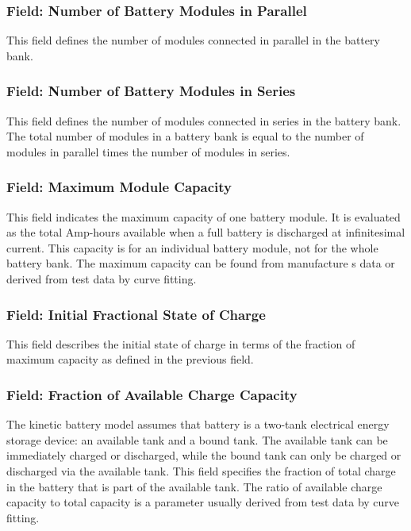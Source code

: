 \subsubsection{Field: Number of Battery Modules in Parallel}\label{field-number-of-battery-modules-in-parallel}

This field defines the number of modules connected in parallel in the battery bank.

\subsubsection{Field: Number of Battery Modules in Series}\label{field-number-of-battery-modules-in-series}

This field defines the number of modules connected in series in the battery bank. The total number of modules in a battery bank is equal to the number of modules in parallel times the number of modules in series.

\subsubsection{Field: Maximum Module Capacity}\label{field-maximum-module-capacity}

This field indicates the maximum capacity of one battery module. It is evaluated as the total Amp-hours available when a full battery is discharged at infinitesimal current. This capacity is for an individual battery module, not for the whole battery bank. The maximum capacity can be found from manufacture s data or derived from test data by curve fitting.

\subsubsection{Field: Initial Fractional State of Charge}\label{field-initial-fractional-state-of-charge}

This field describes the initial state of charge in terms of the fraction of maximum capacity as defined in the previous field.

\subsubsection{Field: Fraction of Available Charge Capacity}\label{field-fraction-of-available-charge-capacity}

The kinetic battery model assumes that battery is a two-tank electrical energy storage device: an available tank and a bound tank. The available tank can be immediately charged or discharged, while the bound tank can only be charged or discharged via the available tank. This field specifies the fraction of total charge in the battery that is part of the available tank. The ratio of available charge capacity to total capacity is a parameter usually derived from test data by curve fitting.

